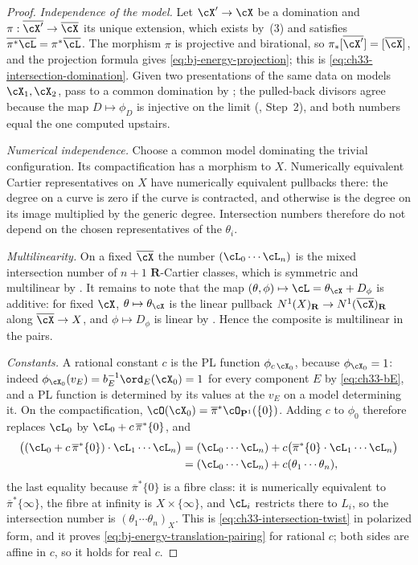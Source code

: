 \begin{proof}
\emph{Independence of the model.}  Let $\cX'\to\cX$ be a domination and
$\pi:\overline{\cX'}\to\overline\cX$ its unique extension, which exists
by \,(3) and satisfies
$\overline{\pi^*\cL}=\pi^*\overline\cL$.  The morphism $\pi$ is
projective and birational, so $\pi_*[\overline{\cX'}]=[\overline\cX]$,
and the projection formula  gives
\eqref{eq:bj-energy-projection}; this is
\eqref{eq:ch33-intersection-domination}.  Given two presentations of the
same data on models $\cX_1,\cX_2$, pass to a common domination by
; the pulled-back divisors agree because
the map $D\mapsto\phi_D$ is injective on the limit
(, Step~2), and both numbers equal the one
computed upstairs.

\emph{Numerical independence.}  Choose a common model dominating the
trivial configuration.  Its compactification has a morphism to $X$.
Numerically equivalent Cartier representatives on $X$ have numerically
equivalent pullbacks there: the degree on a curve is zero if the curve is
contracted, and otherwise is the degree on its image multiplied by the
generic degree.  Intersection numbers therefore do not depend on the
chosen representatives of the $\theta_i$.

\emph{Multilinearity.}  On a fixed $\overline\cX$ the number
$(\cL_0\cdots\cL_n)$ is the mixed intersection number of $n+1$
$\mathbf R$-Cartier classes, which is symmetric and multilinear by
.  It remains to note that the map
$(\theta,\phi)\mapsto\cL=\theta_{\cX}+D_\phi$ is additive: for fixed
$\cX$, $\theta\mapsto\theta_{\cX}$ is the linear pullback
$N^1(X)_{\mathbf R}\to N^1(\overline\cX)_{\mathbf R}$ along
$\overline\cX\to X$, and $\phi\mapsto D_\phi$ is linear by
.  Hence the composite is multilinear in
the pairs.

\emph{Constants.}  A rational constant $c$ is the PL function
$\phi_{c\,\cX_0}$, because $\phi_{\cX_0}=1$: indeed
$\phi_{\cX_0}(v_E)=b_E^{-1}\ord_E(\cX_0)=1$ for every component $E$ by
\eqref{eq:ch33-bE}, and a PL function is determined by its values at the
$v_E$ on a model determining it.  On the compactification,
$\cO(\cX_0)=\overline\pi^*\cO_{\mathbf P^1}(\{0\})$.  Adding $c$ to
$\phi_0$ therefore replaces $\cL_0$ by
$\cL_0+c\,\overline\pi^*\{0\}$, and
\[
\begin{aligned}
 \bigl((\cL_0+c\,\overline\pi^*\{0\})\cdot\cL_1\cdots\cL_n\bigr)
 &=(\cL_0\cdots\cL_n)
   +c\bigl(\overline\pi^*\{0\}\cdot\cL_1\cdots\cL_n\bigr)\\
 &=(\cL_0\cdots\cL_n)+c(\theta_1\cdots\theta_n),
\end{aligned}
\]
the last equality because $\overline\pi^*\{0\}$ is a fibre class:
it is numerically equivalent to $\overline\pi^*\{\infty\}$, the fibre at
infinity is $X\times\{\infty\}$, and $\cL_i$ restricts there to
$L_i$, so the intersection number is $(\theta_1\cdots\theta_n)_X$.
This is \eqref{eq:ch33-intersection-twist} in polarized form, and it proves
\eqref{eq:bj-energy-translation-pairing} for rational $c$; both sides are
affine in $c$, so it holds for real $c$.


\end{proof}
